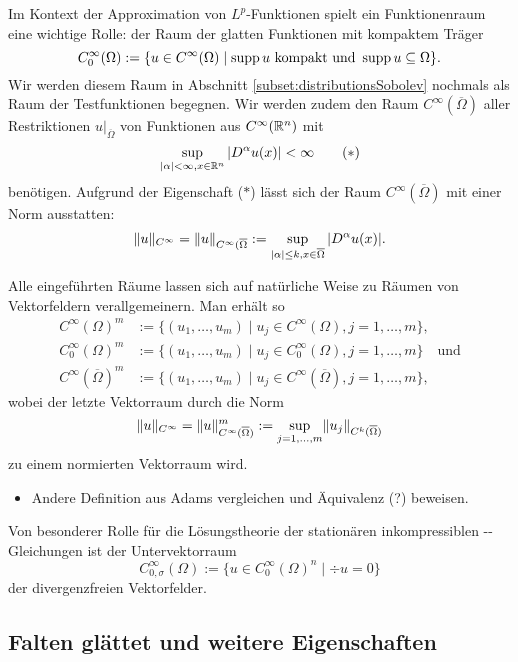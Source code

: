 Im Kontext der Approximation von $L^p$-Funktionen spielt ein Funktionenraum eine wichtige Rolle: der Raum der glatten Funktionen mit kompaktem Träger
$$
C_0^\infty(\Omega) := \{ u \in C^\infty(\Omega) \mid \operatorname{supp} u \text{ kompakt und } \operatorname{supp} u \subseteq \Omega\}.
$$
Wir werden diesem Raum in Abschnitt \ref{subset:distributionsSobolev} nochmals als Raum der Testfunktionen begegnen.
Wir werden zudem den Raum $C^\infty(\overline\Omega)$ aller Restriktionen $u|_{\overline\Omega}$ von Funktionen aus $C^\infty(\mathbb{R}^n)$ mit
\begin{displaymath}
  \sup_{|\alpha| < \infty, x \in \mathbb{R}^n} |D^\alpha u(x)| < \infty \tag{$\ast$}
\end{displaymath}
benötigen.
Aufgrund der Eigenschaft ($\ast$) lässt sich der Raum $C^\infty(\overline\Omega)$ mit einer Norm ausstatten:
$$
\lVert u \rVert_{C^\infty} = \lVert u \rVert_{C^\infty(\overline\Omega} := \sup_{|\alpha|\leq k, x \in \overline\Omega} |D^\alpha u(x)|.
$$

Alle eingeführten Räume lassen sich auf natürliche Weise zu Räumen von Vektorfeldern verallgemeinern.
Man erhält so
\begin{align*}
  C^\infty(\Omega)^m &:= \{(u_1,\dots,u_m) \mid u_j \in C^\infty(\Omega), j = 1,\dots,m\}, \\
  C_0^\infty(\Omega)^m &:= \{(u_1,\dots,u_m) \mid u_j \in C_0^\infty(\Omega), j = 1,\dots,m\} \quad\text{und} \\
  C^\infty(\overline\Omega)^m &:= \{(u_1,\dots,u_m) \mid u_j \in C^\infty(\overline\Omega), j = 1,\dots,m\},
\end{align*}
wobei der letzte Vektorraum durch die Norm
$$
\lVert u \rVert_{C^\infty} = \lVert u \rVert_{C^\infty(\overline\Omega)}^m := \sup_{j = 1,\dots, m} \lVert u_j \rVert_{C^k(\overline\Omega)}
$$
zu einem normierten Vektorraum wird.

\begin{itemize}
  \item Andere Definition aus Adams vergleichen und Äquivalenz (?) beweisen.
\end{itemize}

Von besonderer Rolle für die Lösungstheorie der stationären inkompressiblen \navier\hyp{}\stokes\hyp{}Gleichungen ist der Untervektorraum
$$
C_{0,\sigma}^\infty(\Omega) := \{u \in C_0^\infty(\Omega)^n \mid \div u = 0\}
$$
der divergenzfreien Vektorfelder.

\subsection{Falten glättet und weitere Eigenschaften}
\label{subsec:mollification}

